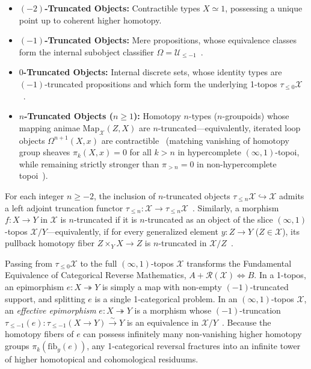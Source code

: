 \documentclass[10pt,twoside,openright]{book}
\theoremstyle{crmplain}
\theoremstyle{crmdef}
\theoremstyle{crmremark}
\begin{document}
\begin{itemize}[leftmargin=1.5em]

  \item \textbf{$(-2)$-Truncated Objects:} Contractible types $X \simeq 1$, possessing a unique point up to coherent higher homotopy.

  \item \textbf{$(-1)$-Truncated Objects:} Mere propositions, whose equivalence classes form the internal subobject classifier $\Omega = \mathcal{U}_{\le -1}$~\cite[\S 6.1.6]{Lurie09}.

  \item \textbf{$0$-Truncated Objects:} Internal discrete sets, whose identity types are $(-1)$-truncated propositions and which form the underlying 1-topos $\tau_{\le 0}\mathcal{X}$~\cite[\S 6.4.5]{Lurie09}.

  \item \textbf{$n$-Truncated Objects ($n \ge 1$):} Homotopy $n$-types ($n$-groupoids) whose mapping animae $\mathrm{Map}_{\mathcal{X}}(Z, X)$ are $n$-truncated---equivalently, iterated loop objects $\Omega^{n+1}(X, x)$ are contractible~\cite[Prop.~5.5.6.5]{Lurie09} (matching vanishing of homotopy group sheaves $\pi_k(X, x) = 0$ for all $k > n$ in hypercomplete $(\infty, 1)$-topoi, while remaining strictly stronger than $\pi_{>n} = 0$ in non-hypercomplete topoi~\cite[\S 6.5.2]{Lurie09}).

\end{itemize}

For each integer $n \ge -2$, the inclusion of $n$-truncated objects $\tau_{\le n}\mathcal{X} \hookrightarrow \mathcal{X}$ admits a left adjoint truncation functor $\tau_{\le n}: \mathcal{X} \to \tau_{\le n}\mathcal{X}$~\cite[Prop.~5.5.6.18]{Lurie09}. Similarly, a morphism $f: X \to Y$ in $\mathcal{X}$ is $n$-truncated if it is $n$-truncated as an object of the slice $(\infty, 1)$-topos $\mathcal{X}/Y$---equivalently, if for every generalized element $y : Z \to Y$ ($Z \in \mathcal{X}$), its pullback homotopy fiber $Z \times_Y X \to Z$ is $n$-truncated in $\mathcal{X}/Z$~\cite[Prop.~5.5.6.18]{Lurie09}.

Passing from $\tau_{\le 0}\mathcal{X}$ to the full $(\infty, 1)$-topos $\mathcal{X}$ transforms the Fundamental Equivalence of Categorical Reverse Mathematics, $A + \mathcal{R}(\mathcal{X}) \iff B$. In a 1-topos, an epimorphism $e: X \twoheadrightarrow Y$ is simply a map with non-empty $(-1)$-truncated support, and splitting $e$ is a single 1-categorical problem. In an $(\infty, 1)$-topos $\mathcal{X}$, an \emph{effective epimorphism} $e: X \twoheadrightarrow Y$ is a morphism whose $(-1)$-truncation $\tau_{\le -1}(e): \tau_{\le -1}(X \to Y) \xrightarrow{\sim} Y$ is an equivalence in $\mathcal{X}/Y$~\cite[\S 6.2.3, Prop.~7.2.1.14]{Lurie09}. Because the homotopy fibers of $e$ can possess infinitely many non-vanishing higher homotopy groups $\pi_k(\mathrm{fib}_y(e))$, any 1-categorical reversal fractures into an infinite tower of higher homotopical and cohomological residuums.
\end{document}
